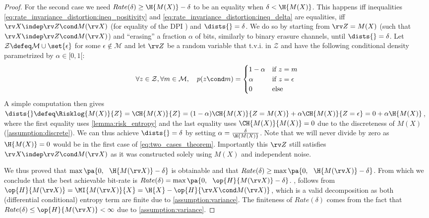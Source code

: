 \documentclass[final]{article}
\begin{document}
\begin{proof}
For the second case we need $Rate(\delta) \geq \H{M(X)} - \delta$ to be an equality when $\delta < \H{M(X)}$. 
This happens iff  inequalities \cref{eq:rate_invariance_distortion:ineq_positivity} and \cref{eq:rate_invariance_distortion:ineq_delta} are equalities, \ie iff 
$\rv X \indep \rv Z \cond M(\rv X)$ (for equality of the DPI \cite{cover_elements_2006}) and
$\dists{}=\delta$.
We do so by starting from $\rv Z = M(X)$ (such that $\rv X \indep \rv Z \cond M(\rv X)$) and ``erasing'' a fraction $\alpha$ of bits, similarly to binary erasure channels, until $\dists{}=\delta$.
Let $\mathcal{Z} \defeq \mathcal{M} \cup \set{ \epsilon}$ for some $\epsilon \not\in \mathcal{M}$ and let $\rv Z$ be a random variable that t.v.i. in $\mathcal{Z}$ and have the following conditional density parametrized by $\alpha \in [0,1[$:
\begin{equation}
\forall z \in \mathcal{Z}, \forall m \in \mathcal{M}, \quad p(z \cond m) =
\begin{cases}
1-\alpha & \text{if } z=m \\
\alpha & \text{if } z=\epsilon \\
0 &  \text{else } \\
\end{cases}
\end{equation}
A simple computation then gives $\dists{}\defeq \Risklog{M(X)}{Z} = \CH{M(X)}{Z}=(1-\alpha) \CH{M(X)}{Z=M(X)} + \alpha \CH{M(X)}{Z=\epsilon}= 0 + \alpha \H{M(X)}$, where the first equality uses \cref{lemma:risk_entropy} and the last equality uses $\CH{M(X)}{M(X)}=0$ due to the discreteness of $M(X)$ (\cref{assumption:discrete}).
We can thus achieve $\dists{}=\delta$ by setting $ \alpha = \frac{\delta}{\H{M(X)}}$.
Note that we will never divide by zero as $\H{M(X)}=0$ would be in the first case of \cref{eq:two_cases_theorem}. 
Importantly this $\rv Z$ still satisfies $\rv X \indep \rv Z \cond M(\rv X)$ as it was constructed solely using $M(X)$ and independent noise.

We thus proved that $\max \pa{0, \ \ \H{M(\rv X)} - \delta}$ is obtainable and that $Rate(\delta) \geq \max \pa{0, \ \ \H{M(\rv X)} - \delta}$.
From which we conclude that the best achievable bit-rate is $Rate(\delta) = \max \pa{0, \ \ \op{H}{M(\rv X)} - \delta}$.
, follows from $\op{H}{M(\rv X)} = \MI{M(\rv X)}{X} = \H{X} - \op{H}{\rv X \cond M(\rv X)}$, which is a valid decomposition as both (differential conditional) entropy term are finite due to \cref{assumption:variance}.
The finiteness of $Rate(\delta)$ comes from the  fact that $Rate(\delta) \leq \op{H}{M(\rv X)} < \infty$ due to \cref{assumption:variance}.
\end{proof}
\end{document}
